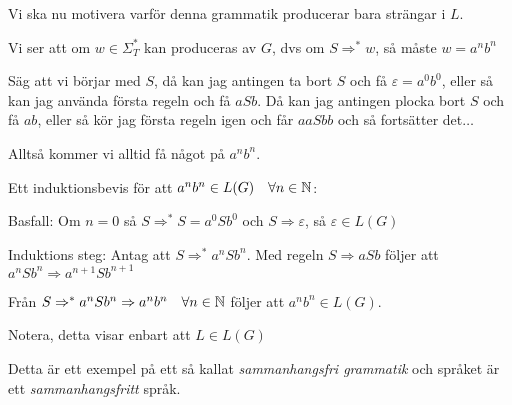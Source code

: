 \noindent Vi ska nu motivera varför denna grammatik producerar bara strängar i $L$.\par
\noindent Vi ser att om $w\in\Sigma_T^*$ kan produceras av $G$, dvs om $S\Rightarrow^*w$, så måste $w = a^nb^n$
\par\bigskip
\noindent Säg att vi börjar med $S$, då kan jag antingen ta bort $S$ och få $\varepsilon = a^0b^0$, eller så kan jag använda första regeln och få $aSb$. Då kan jag antingen plocka bort $S$ och få $ab$, eller så kör jag första regeln igen och får $aaSbb$ och så fortsätter det$\hdots$\par
\noindent Alltså kommer vi alltid få något på $a^nb^n$.
\par\bigskip
\noindent Ett induktionsbevis för att $a^nb^n\in L(G)\quad\forall n\in\mathbb{N}$:\par
\noindent Basfall: Om $n=0$ så $S\Rightarrow^*S=a^0Sb^0$ och $S\Rightarrow\varepsilon$, så $\varepsilon\in L(G)$\par
\noindent Induktions steg: Antag att $S\Rightarrow^*a^nSb^n$. Med regeln $S\Rightarrow aSb$ följer att $a^nSb^n\Rightarrow a^{n+1}Sb^{n+1}$\par
\noindent Från $S\Rightarrow^*a^nSb^n\Rightarrow a^nb^n\quad\forall n\in\mathbb{N}$ följer att $a^nb^n\in L(G)$.\par
\noindent Notera, detta visar enbart att $L\in L(G)$\par
\noindent Detta är ett exempel på ett så kallat \textit{sammanhangsfri grammatik} och språket är ett \textit{sammanhangsfritt} språk.
\par\bigskip
